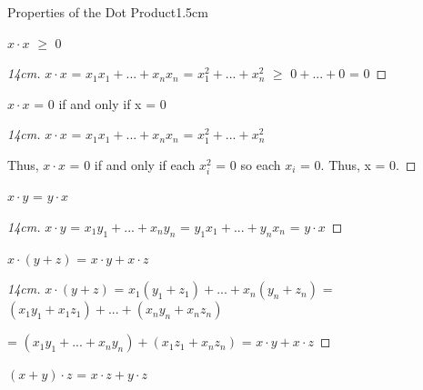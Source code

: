    \vspace{0.5cm}



    \begin{ltheorem}{Properties of the Dot Product}{1.5cm}
        \item $x \cdot x$ $\geq$ 0
        
            \begin{proof}[14cm]
                $x \cdot x$
                = $x_1x_1 + ... + x_nx_n$
                = $x_1^2 + ... + x_n^2$
                $\geq$ $0 + ... + 0$
                = 0
            \end{proof}

        \item $x \cdot x$ = 0 if and only if x = 0 
        
            \begin{proof}[14cm]
                $x \cdot x$
                = $x_1x_1 + ... + x_nx_n$
                = $x_1^2 + ... + x_n^2$
                
                Thus, $x \cdot x$ = 0
                if and only if each $x_i^2$ = 0
                so each $x_i$ = 0.
                Thus, x = 0.
            \end{proof}

        \item $x \cdot y$ = $y \cdot x$
            
            \begin{proof}[14cm]
                $x \cdot y$
                = $x_1y_1 + ... + x_ny_n$
                = $y_1x_1 + ... + y_nx_n$
                = $y \cdot x$
            \end{proof}

            \newpage

        \item $x \cdot (y+z)$ = $x \cdot y + x \cdot z$
        
            \begin{proof}[14cm]
                $x \cdot (y+z)$
                = $x_1(y_1+z_1) + ... + x_n(y_n+z_n)$
                = $(x_1y_1+x_1z_1) + ... + (x_ny_n+x_nz_n)$

                \hspace{1.6cm}
                = $(x_1y_1+...+x_ny_n) + (x_1z_1+x_nz_n)$
                = $x \cdot y + x \cdot z$
            \end{proof}

        \item $(x+y) \cdot z$ = $x \cdot z + y \cdot z$
            

\end{ltheorem}
